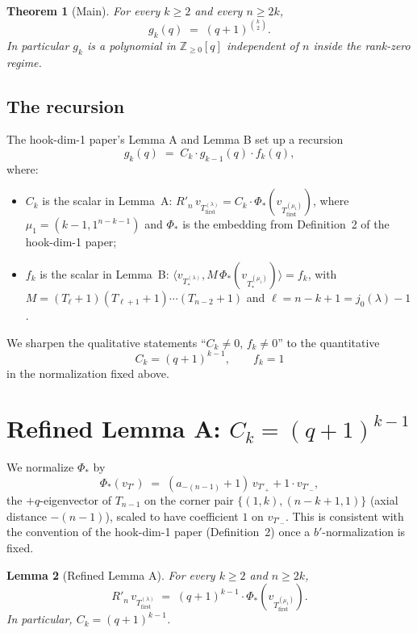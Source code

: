 \documentclass[11pt]{article}
\newtheorem{theorem}{Theorem}
\newtheorem{lemma}[theorem]{Lemma}
\theoremstyle{definition}
\begin{document}
\begin{theorem}[Main]\label{thm:main}
For every $k \ge 2$ and every $n \ge 2k$,
\[
   g_k(q) \;=\; (q+1)^{\binom{k}{2}}.
\]
In particular $g_k$ is a polynomial in $\mathbb{Z}_{\ge 0}[q]$
independent of $n$ inside the rank-zero regime.
\end{theorem}

\subsection{The recursion}

The hook-dim-1 paper's Lemma A and Lemma B set up a recursion
\begin{equation}\label{eq:recursion-frame}
   g_k(q) \;=\; C_k \cdot g_{k-1}(q) \cdot f_k(q),
\end{equation}
where:
\begin{itemize}[leftmargin=2em,topsep=0.2em,itemsep=0.1em]
\item $C_k$ is the scalar in Lemma~A: $R'_n\,v_{T_{\mathrm{first}}^{(\lambda)}}
   = C_k \cdot \Phi_*(v_{T_{\mathrm{first}}^{(\mu_1)}})$, where
   $\mu_1 = (k-1, 1^{n-k-1})$ and $\Phi_*$ is the embedding from
   Definition~2 of the hook-dim-1 paper;
\item $f_k$ is the scalar in Lemma~B:
   $\langle v_{T_{*}^{(\lambda)}}, M\,\Phi_*(v_{T_{*}^{(\mu_1)}})\rangle = f_k$,
   with $M = (T_\ell{+}1)(T_{\ell+1}{+}1)\cdots(T_{n-2}{+}1)$ and
   $\ell = n - k + 1 = j_0(\lambda) - 1$.
\end{itemize}
We sharpen the qualitative statements ``$C_k \ne 0$, $f_k \ne 0$'' to
the quantitative
\[
   C_k = (q+1)^{k-1}, \qquad f_k = 1
\]
in the normalization fixed above.

\section{Refined Lemma A: $C_k = (q+1)^{k-1}$}\label{sec:lemA}

We normalize $\Phi_*$ by
\begin{equation}\label{eq:phi-norm}
   \Phi_*(v_{T'}) \;=\; (a_{-(n-1)} + 1)\, v_{T'_+} + 1 \cdot v_{T'_-},
\end{equation}
the $+q$-eigenvector of $T_{n-1}$ on the corner pair
$\{(1,k), (n-k+1,1)\}$ (axial distance $-(n-1)$), scaled to have
coefficient $1$ on $v_{T'_-}$.  This is consistent with the convention
of the hook-dim-1 paper (Definition~2) once a $b'$-normalization is
fixed.

\begin{lemma}[Refined Lemma A]\label{lem:Ck}
For every $k \ge 2$ and $n \ge 2k$,
\[
   R'_n\,v_{T_{\mathrm{first}}^{(\lambda)}}
   \;=\; (q+1)^{k-1} \cdot \Phi_*(v_{T_{\mathrm{first}}^{(\mu_1)}}).
\]
In particular, $C_k = (q+1)^{k-1}$.
\end{lemma}
\end{document}
